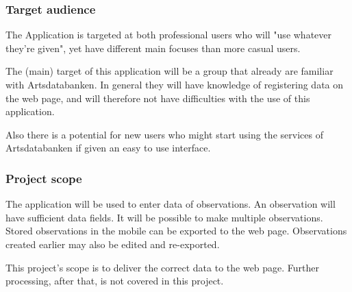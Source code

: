 \subsubsection{Target audience}
	
The Application is targeted at both professional users who will "use whatever they're given",
yet have different main focuses than more casual users.

The (main) target of this application will be a group that already are familiar with Artsdatabanken.
In general they will have knowledge of registering data on the web page, and will therefore not
have difficulties with the use of this application.

Also there is a potential for new users who might start using the services of Artsdatabanken if
given an easy to use interface.


\subsubsection{Project scope}
The application will be used to enter data of observations.
An observation will have sufficient data fields.
It will be possible to make multiple observations.
Stored observations in the mobile can be exported to the web page.
Observations created earlier may also be edited and re-exported.

This project's scope is to deliver the correct data to the web page.
Further processing, after that, is not covered in this project.
